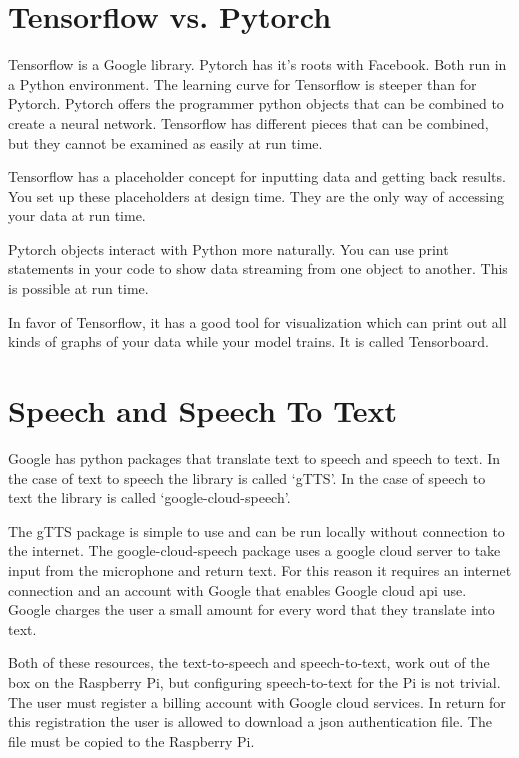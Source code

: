 \section{Tensorflow vs. Pytorch}

Tensorflow is a Google library. Pytorch has it's roots with Facebook. Both run in a Python environment. The learning curve for Tensorflow is steeper than for Pytorch. Pytorch offers the programmer python objects that can be combined to create a neural network. Tensorflow has different pieces that can be combined, but they cannot be examined as easily at run time.

Tensorflow has a placeholder concept for inputting data and getting back results. You set up these placeholders at design time. They are the only way of accessing your data at run time.

Pytorch objects interact with Python more naturally. You can use print statements in your code to show data streaming from one object to another. This is possible at run time.

In favor of Tensorflow, it has a good tool for visualization which can print out all kinds of graphs of your data while your model trains. It is called Tensorboard.

\section{Speech and Speech To Text}

Google has python packages that translate text to speech and speech to text. In the case of text to speech the library is called `gTTS'. In the case of speech to text the library is called `google-cloud-speech'. 

The gTTS package is simple to use and can be run locally without connection to the internet. The google-cloud-speech package uses a google cloud server to take input from the microphone and return text. For this reason it requires an internet connection and an account with Google that enables Google cloud api use. Google charges the user a small amount for every word that they translate into text. 

Both of these resources, the text-to-speech and speech-to-text, work out of the box on the Raspberry Pi, but configuring speech-to-text for the Pi is not trivial. The user must register a billing account with Google cloud services. In return for this registration the user is allowed to download a json authentication file. The file must be copied to the Raspberry Pi. 

